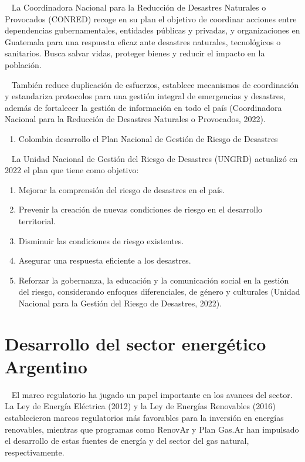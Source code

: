 \documentclass{article}
\providecommand{\tightlist}{%
  \setlength{\itemsep}{0pt}\setlength{\parskip}{0pt}}
\begin{document}
~ La Coordinadora Nacional para la Reducción de Desastres Naturales o
Provocados (CONRED) recoge en su plan el objetivo de coordinar acciones
entre dependencias gubernamentales, entidades públicas y privadas, y
organizaciones en Guatemala para una respuesta eficaz ante desastres
naturales, tecnológicos o sanitarios. Busca salvar vidas, proteger
bienes y reducir el impacto en la población.

~ También reduce duplicación de esfuerzos, establece mecanismos de
coordinación y estandariza protocolos para una gestión integral de
emergencias y desastres, además de fortalecer la gestión de información
en todo el país (Coordinadora Nacional para la Reducción de Desastres
Naturales o Provocados, 2022).

\begin{enumerate}
\def\labelenumi{\arabic{enumi}.}
\setcounter{enumi}{3}
\tightlist
\item
  Colombia desarrollo el Plan Nacional de Gestión de Riesgo de Desastres
\end{enumerate}

~ La Unidad Nacional de Gestión del Riesgo de Desastres (UNGRD)
actualizó en 2022 el plan que tiene como objetivo:

\begin{enumerate}
\def\labelenumi{\arabic{enumi}.}
\tightlist
\item
  Mejorar la comprensión del riesgo de desastres en el país.
\item
  Prevenir la creación de nuevas condiciones de riesgo en el desarrollo
  territorial.
\item
  Disminuir las condiciones de riesgo existentes.
\item
  Asegurar una respuesta eficiente a los desastres.
\item
  Reforzar la gobernanza, la educación y la comunicación social en la
  gestión del riesgo, considerando enfoques diferenciales, de género y
  culturales (Unidad Nacional para la Gestión del Riesgo de Desastres,
  2022).
\end{enumerate}

\hypertarget{desarrollo-del-sector-energuxe9tico-argentino}{%
\section{Desarrollo del sector energético
Argentino}\label{desarrollo-del-sector-energuxe9tico-argentino}}

~ El marco regulatorio ha jugado un papel importante en los avances del
sector. La Ley de Energía Eléctrica (2012) y la Ley de Energías
Renovables (2016) establecieron marcos regulatorios más favorables para
la inversión en energías renovables, mientras que programas como RenovAr
y Plan Gas.Ar han impulsado el desarrollo de estas fuentes de energía y
del sector del gas natural, respectivamente.
\end{document}
